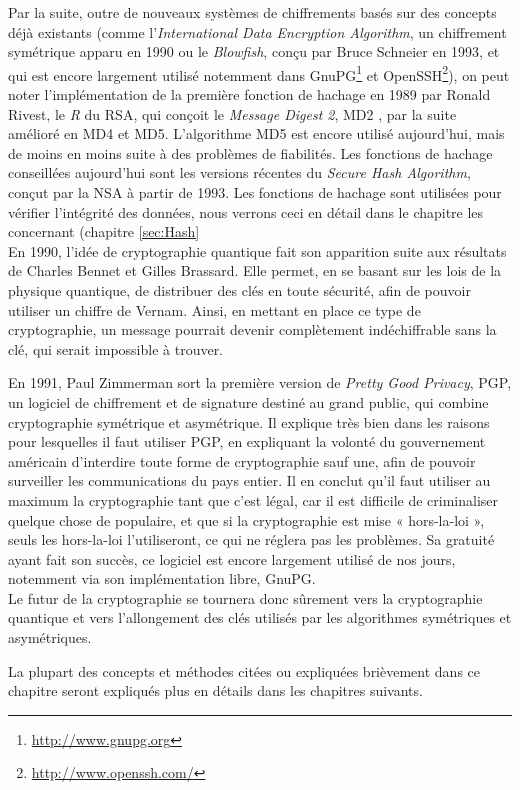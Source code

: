 Par la suite, outre de nouveaux systèmes de chiffrements basés sur des
concepts déjà existants (comme l'\emph{International Data Encryption
  Algorithm}, un chiffrement symétrique apparu en 1990 ou le
\emph{Blowfish}, conçu par Bruce Schneier en 1993, et qui est encore
largement utilisé notemment dans
GnuPG\footnote{\url{http://www.gnupg.org}} et
OpenSSH\footnote{\url{http://www.openssh.com/}}), on peut noter
l'implémentation de la première fonction de hachage en 1989 par Ronald
Rivest, le \emph{R} du RSA, qui conçoit le \emph{Message Digest 2},
MD2 , par la suite amélioré en MD4 et MD5. L'algorithme MD5 est encore
utilisé aujourd'hui, mais de moins en moins suite à des problèmes de
fiabilités. Les fonctions de hachage conseillées aujourd'hui sont les
versions récentes du \emph{Secure Hash Algorithm}, conçut par la NSA à
partir de 1993. Les fonctions de hachage sont utilisées pour vérifier
l'intégrité des données, nous verrons ceci en détail dans le chapitre
les concernant (chapitre \ref{sec:Hash}\\

En 1990, l'idée de cryptographie quantique fait son apparition suite
aux résultats de Charles Bennet et Gilles Brassard. Elle permet, en se
basant sur les lois de la physique quantique, de distribuer des clés
en toute sécurité, afin de pouvoir utiliser un chiffre de
Vernam. Ainsi, en mettant en place ce type de cryptographie, un
message pourrait devenir complètement indéchiffrable sans la clé, qui
serait impossible à trouver.

En 1991, Paul Zimmerman sort la première version de \emph{Pretty Good
 Privacy}, PGP, un logiciel de chiffrement et de signature destiné au
grand public, qui combine cryptographie symétrique et asymétrique. Il
explique très bien dans \cite{WhyIWrotePGP} les raisons pour
lesquelles il faut utiliser PGP, en expliquant la volonté du
gouvernement américain d'interdire toute forme de cryptographie sauf
une, afin de pouvoir surveiller les communications du pays entier. Il
en conclut qu'il faut utiliser au maximum la cryptographie tant que
c'est légal, car il est difficile de criminaliser quelque chose de
populaire, et que si la cryptographie est mise « hors-la-loi », seuls
les hors-la-loi l'utiliseront, ce qui ne réglera pas les problèmes. Sa
gratuité ayant fait son succès, ce logiciel est encore largement
utilisé de nos jours, notemment via son implémentation libre, GnuPG. \\

Le futur de la cryptographie se tournera donc sûrement vers la
cryptographie quantique et vers l'allongement des clés utilisés par
les algorithmes symétriques et asymétriques.

La plupart des concepts et méthodes citées ou expliquées brièvement
dans ce chapitre seront expliqués plus en détails dans les chapitres
suivants.
